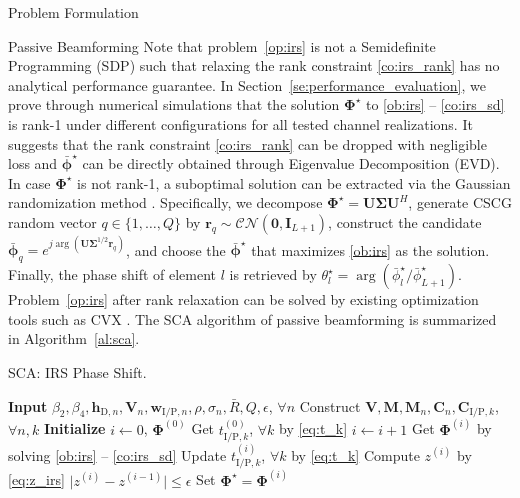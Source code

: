 \documentclass[journal]{IEEEtran}
\begin{document}
\begin{section}{Problem Formulation}
\begin{subsection}{Passive Beamforming}
			Note that problem~\eqref{op:irs} is not a Semidefinite Programming (SDP) such that relaxing the rank constraint \eqref{co:irs_rank} has no analytical performance guarantee. In Section~\ref{se:performance_evaluation}, we prove through numerical simulations that the solution $\boldsymbol{\Phi}^{\star}$ to \ref{ob:irs} -- \ref{co:irs_sd} is rank-\num{1} under different configurations for all tested channel realizations. It suggests that the rank constraint \eqref{co:irs_rank} can be dropped with negligible loss and $\bar{\boldsymbol{\phi}}^\star$ can be directly obtained through Eigenvalue Decomposition (EVD). In case $\boldsymbol{\Phi}^{\star}$ is not rank-\num{1}, a suboptimal solution can be extracted via the Gaussian randomization method \cite{Huang2010}. Specifically, we decompose $\boldsymbol{\Phi}^{\star}=\boldsymbol{U}\boldsymbol{\Sigma}\boldsymbol{U}^H$, generate CSCG random vector $q \in \{1, \dots, Q\}$ by $\boldsymbol{r}_q \sim \mathcal{CN}(\boldsymbol{0},\boldsymbol{I}_{L+1})$, construct the candidate $\bar{\boldsymbol{\phi}}_q=e^{j\arg\left(\boldsymbol{U}\boldsymbol{\Sigma}^{1/2}\boldsymbol{r}_q\right)}$, and choose the $\bar{\boldsymbol{\phi}}^\star$ that maximizes \eqref{ob:irs} as the solution. Finally, the phase shift of element $l$ is retrieved by $\theta_l^{\star}=\arg(\bar{\phi}_l^\star/\bar{\phi}_{L+1}^\star)$. Problem~\eqref{op:irs} after rank relaxation can be solved by existing optimization tools such as CVX \cite{Grant2013}. The SCA algorithm of passive beamforming is summarized in Algorithm~\ref{al:sca}.
			\begin{algorithm}[!t]
				\caption{SCA: IRS Phase Shift.}
				\label{al:sca}
				\begin{algorithmic}[1]
					\State \textbf{Input} $\beta_2,\beta_4,\boldsymbol{h}_{\mathrm{D},n},\boldsymbol{V}_{n},\boldsymbol{w}_{\mathrm{I/P},n},\rho,\sigma_n,\bar{R},Q,\epsilon$, $\forall n$
					\State Construct $\boldsymbol{V},\boldsymbol{M},\boldsymbol{M}_n,\boldsymbol{C}_{n},\boldsymbol{C}_{\mathrm{I/P},k}$, $\forall n,k$
					\State \textbf{Initialize} $i \gets 0$, $\boldsymbol{\Phi}^{(0)}$
					\State Get $t_{\mathrm{I/P},k}^{(0)}$, $\forall k$ by \eqref{eq:t_k}
					\Repeat
						\State $i \gets i + 1$
						\State Get $\boldsymbol{\Phi}^{(i)}$ by solving \ref{ob:irs} -- \ref{co:irs_sd}
						\State Update $t_{\mathrm{I/P},k}^{(i)}$, $\forall k$ by \eqref{eq:t_k}
						\State Compute $z^{(i)}$ by \eqref{eq:z_irs}
					\Until $\lvert z^{(i)}-z^{(i-1)} \rvert \le \epsilon$
					\State Set $\boldsymbol{\Phi}^{\star}=\boldsymbol{\Phi}^{(i)}$

\end{algorithmic}
\end{algorithm}
\end{subsection}
\end{section}
\end{document}
